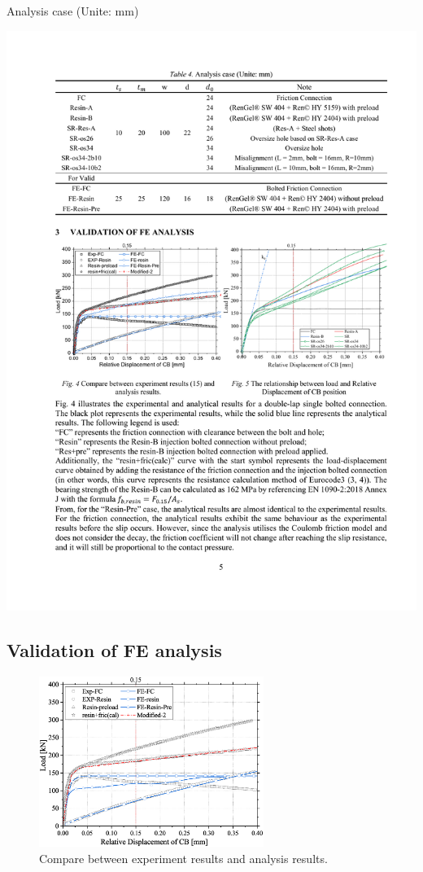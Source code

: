 \begin{table}[htbp]
    \centering
    \caption{Analysis case (Unite: mm)}
    \label{tab-app3-4}
    \includegraphics[width=\textwidth]{imgs/app3/ana-case-RIBJ.pdf}
    
\end{table}

\subsection{Validation of FE analysis}

\begin{figure}[htbp]
    \centering
    \includegraphics[width=0.65\textwidth]{imgs/app3/valid-RIBJ.eps}
    \caption{Compare between experiment results \cite{derks_msc_2023} and analysis results.}
    \label{fig-valid-RIBJ}
\end{figure}

